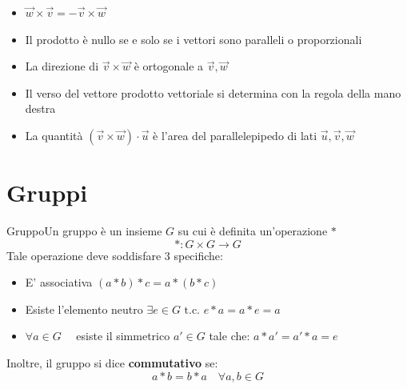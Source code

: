 \begin{itemize}
	\item $\vec{w} \times \vec{v} = - \vec{v} \times \vec{w}$
	\item Il prodotto è nullo se e solo se i vettori sono paralleli o proporzionali
	\item La direzione di $ \vec{v} \times \vec{w}$ è ortogonale a $\vec{v}, \vec{w}$
	\item Il verso del vettore prodotto vettoriale si determina con la regola della mano destra
	\item La quantità $ \left( \vec{v} \times \vec{w} \right) \cdot \vec{u} $ è l'area del parallelepipedo di lati $\vec{u},\vec{v},\vec{w}$
\end{itemize}


\section{Gruppi}
\begin{definizione}{Gruppo}Un gruppo è un insieme $G$ su cui è definita un'operazione $*$  \[
		* : G \times G \rightarrow G
	\]
	Tale operazione deve soddisfare 3 specifiche:
	\begin{itemize}
		\item E' associativa $ \left( a*b \right) *c = a* \left( b*c \right) $
		\item Esiste l'elemento neutro $ \exists e  \in G \text{ t.c. }e* a = a * e = a$
		\item $ \forall a  \in  G \quad$ esiste il simmetrico $ a'  \in G$ tale che: $ a * a' = a' * a=e$
	\end{itemize}
	Inoltre, il gruppo si dice \textbf{ commutativo} se:  \[
		a * b = b * a \quad \forall a, b  \in  G
	\]
\end{definizione}

